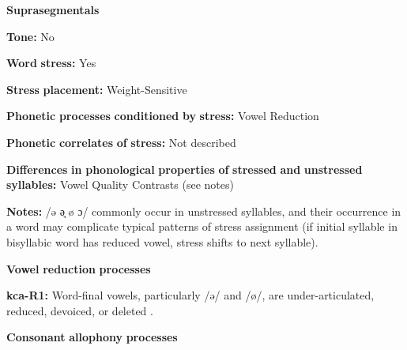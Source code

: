 \documentclass[output=paper]{langsci/langscibook}
\begin{document}
\begin{styleBody}
\textbf{Suprasegmentals}
\end{styleBody}

\begin{styleBody}
\textbf{Tone:} No
\end{styleBody}

\begin{styleBody}
\textbf{Word} \textbf{stress:} Yes
\end{styleBody}

\begin{styleBody}
\textbf{Stress} \textbf{placement:} Weight-Sensitive
\end{styleBody}

\begin{styleBody}
\textbf{Phonetic} \textbf{processes} \textbf{conditioned} \textbf{by} \textbf{stress:} Vowel Reduction
\end{styleBody}

\begin{styleBody}
\textbf{Phonetic} \textbf{correlates} \textbf{of} \textbf{stress:} Not described
\end{styleBody}

\begin{styleBody}
\textbf{Differences} \textbf{in} \textbf{phonological} \textbf{properties} \textbf{of} \textbf{stressed} \textbf{and} \textbf{unstressed} \textbf{syllables:} Vowel Quality Contrasts (see notes)
\end{styleBody}

\begin{styleBody}
\textbf{Notes:} /ə ə̘ ø ɔ/ commonly occur in unstressed syllables, and their occurrence in a word may complicate typical patterns of stress assignment (if initial syllable in bisyllabic word has reduced vowel, stress shifts to next syllable).
\end{styleBody}

\begin{styleBody}
\textbf{Vowel} \textbf{reduction} \textbf{processes}
\end{styleBody}

\begin{styleBody}
\textbf{kca-R1:} Word-final vowels, particularly /ə/ and /ø/, are under-articulated, reduced, devoiced, or deleted \citep[56]{Filchenko2007}.
\end{styleBody}

\begin{styleBody}
\textbf{Consonant} \textbf{allophony} \textbf{processes}
\end{styleBody}
\end{document}
